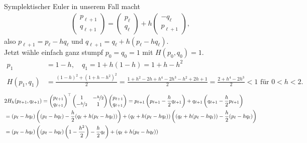 \begin{solution}
Symplektischer Euler in unserem Fall macht
\begin{align*}
\begin{pmatrix}
  p_{\ell + 1} \\ q_{\ell + 1}
\end{pmatrix}
= \begin{pmatrix}
  p_{\ell} \\ q_{\ell}
\end{pmatrix} +
h\begin{pmatrix}
  -q_{\ell} \\
  p_{\ell + 1}
\end{pmatrix},
\end{align*}
also $p_{\ell + 1} = p_{\ell} - hq_{\ell}$ und $q_{\ell + 1} = q_{\ell} + h(p_{\ell} - hq_{\ell})$. \\
Jetzt wähle einfach ganz stumpf $p_0 = q_0 = 1$ mit $H(p_0,q_0) = 1$.
\begin{align*}
  p_1 &= 1 - h, \quad q_1 = 1 + h(1-h) = 1 + h - h^2 \\
  H(p_1,q_1) &= \frac{(1-h)^2+ (1+h-h^2)^2}{2} = \frac{1+h^2-2h+h^4-2h^3-h^2+2h+1}{2}
  = \frac{2+h^4-2h^3}{2} < 1 \text{ für } 0 < h < 2.
\end{align*}
\begin{align*}
  &2H_h(p_{\ell + 1},q_{\ell + 1})
  = \begin{pmatrix}
    p_{\ell + 1} \\ q_{\ell + 1}
  \end{pmatrix}^{\top}
  \begin{pmatrix}
    1 & - \nicefrac{h}{2} \\ -\nicefrac{h}{2} & 1
  \end{pmatrix}
  \begin{pmatrix}
    p_{\ell + 1} \\ q_{\ell + 1}
  \end{pmatrix}
  = p_{\ell + 1}\left(p_{\ell + 1} - \frac{h}{2}q_{\ell + 1}\right) +
  q_{\ell + 1}\left(q_{\ell + 1} - \frac{h}{2}p_{\ell + 1}\right) \\
  &= (p_{\ell} - hq_{\ell})
  \left((p_{\ell} - hq_{\ell}) - \frac{h}{2}(q_{\ell} + h(p_{\ell} - hq_{\ell}))\right) +
  (q_{\ell} + h(p_{\ell} - hq_{\ell}))
  \left((q_{\ell} + h(p_{\ell} - hq_{\ell})) - \frac{h}{2}(p_{\ell} - hq_{\ell})\right) \\
  &= (p_{\ell} - hq_{\ell})
  \left((p_{\ell} - hq_{\ell})\left(1-\frac{h^2}{2}\right) - \frac{h}{2}q_{\ell}\right) +
  (q_{\ell} + h(p_{\ell} - hq_{\ell}))

\end{align*}
\end{solution}
